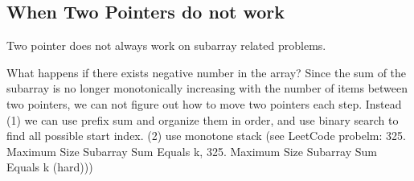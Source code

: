 \documentclass[../main.tex]{subfiles}
\begin{document}





        

\subsection{When Two Pointers do not work} Two pointer does not always work on subarray related problems.
\begin{bclogo}[couleur = blue!30, arrondi=0.1,logo=\bccrayon,ombre=true]{What happens if there exists negative number in the array? } Since the sum of the subarray is no longer monotonically increasing with the number of items between two pointers, we can not figure out how to move two pointers each step. Instead (1) we can use prefix sum and organize them in order, and use binary search to find all possible start index.  (2) use monotone stack (see  LeetCode probelm: 325. Maximum Size Subarray Sum Equals k, 325. Maximum Size Subarray Sum Equals k (hard)))
\end{bclogo}
\end{document}
